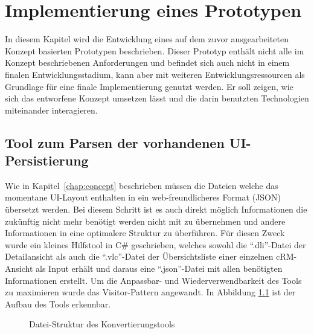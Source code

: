 \chapter{Implementierung eines Prototypen}
\label{chap:implementation}

In diesem Kapitel wird die Entwicklung eines auf dem zuvor ausgearbeiteten Konzept basierten Prototypen beschrieben. Dieser Prototyp enthält nicht alle im Konzept beschriebenen Anforderungen und befindet sich auch nicht in einem finalen Entwicklungsstadium, kann aber mit weiteren Entwicklungsressourcen als Grundlage für eine finale Implementierung genutzt werden. Er soll zeigen, wie sich das entworfene Konzept umsetzen lässt und die darin benutzten Technologien miteinander interagieren.

\section{Tool zum Parsen der vorhandenen UI-Persistierung}

Wie in Kapitel~\ref{chap:concept} beschrieben müssen die Dateien welche das momentane UI-Layout enthalten in ein web-freundlicheres Format (JSON) übersetzt werden. Bei diesem Schritt ist es auch direkt möglich Informationen die zukünftig nicht mehr benötigt werden nicht mit zu übernehmen und andere Informationen in eine optimalere Struktur zu überführen. Für diesen Zweck wurde ein kleines Hilfstool in C\# geschrieben, welches sowohl die ``.dli''-Datei der Detailansicht als auch die ``.vlc''-Datei der Übersichtsliste einer einzelnen cRM-Ansicht als Input erhält und daraus eine ``.json''-Datei mit allen benötigten Informationen erstellt. Um die Anpassbar- und Wiederverwendbarkeit des Tools zu maximieren wurde das Visitor-Pattern  angewandt. In Abbildung \ref{fig:web-conv_file-tree} ist der Aufbau des Tools erkennbar.

\begin{figure}
    \centering
    \captionsetup{justification=centering}
        \caption{Datei-Struktur des Konvertierungstools}
        \label{fig:web-conv_file-tree}
\end{figure}

